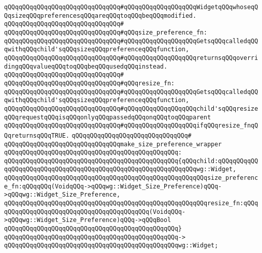 \verb|qQQqqQQqqQQqqQQqqQQqqQQqqQQqqQQq#qQQqqQQqqQQqqQQqqQQqWidgetqQQqwhoseqQQqsizeqQQqpreferencesqQQqareqQQqtoqQQqbeqQQqmodified.|\newline
\verb|qQQqqQQqqQQqqQQqqQQqqQQqqQQqqQQq#|\newline
\verb|qQQqqQQqqQQqqQQqqQQqqQQqqQQqqQQq#qQQqsize_preference_fn:|\newline
\verb|qQQqqQQqqQQqqQQqqQQqqQQqqQQqqQQq#qQQqqQQqqQQqqQQqqQQqGetsqQQqcalledqQQqwithqQQqchild'sqQQqsizeqQQqpreferenceqQQqfunction,|\newline
\verb|qQQqqQQqqQQqqQQqqQQqqQQqqQQqqQQq#qQQqqQQqqQQqqQQqqQQqreturnsqQQqoverridingqQQqvalueqQQqtoqQQqbeqQQqusedqQQqinstead.|\newline
\verb|qQQqqQQqqQQqqQQqqQQqqQQqqQQqqQQq#|\newline
\verb|qQQqqQQqqQQqqQQqqQQqqQQqqQQqqQQq#qQQqresize_fn:|\newline
\verb|qQQqqQQqqQQqqQQqqQQqqQQqqQQqqQQq#qQQqqQQqqQQqqQQqqQQqGetsqQQqcalledqQQqwithqQQqchild'sqQQqsizeqQQqpreferenceqQQqfunction,|\newline
\verb|qQQqqQQqqQQqqQQqqQQqqQQqqQQqqQQq#qQQqqQQqqQQqqQQqqQQqchild'sqQQqresizeqQQqrequestqQQqisqQQqonlyqQQqpassedqQQqonqQQqtoqQQqparent|\newline
\verb|qQQqqQQqqQQqqQQqqQQqqQQqqQQqqQQq#qQQqqQQqqQQqqQQqqQQqifqQQqresize_fnqQQqreturnsqQQqTRUE.|\newline
\verb|qQQqqQQqqQQqqQQqqQQqqQQqqQQqqQQq#|\newline
\verb|qQQqqQQqqQQqqQQqqQQqqQQqqQQqqQQqmake_size_preference_wrapper|\newline
\verb|qQQqqQQqqQQqqQQqqQQqqQQqqQQqqQQqqQQqqQQqqQQqqQQq:|\newline
\verb|qQQqqQQqqQQqqQQqqQQqqQQqqQQqqQQqqQQqqQQqqQQqqQQq{qQQqchild:qQQqqQQqqQQqqQQqqQQqqQQqqQQqqQQqqQQqqQQqqQQqqQQqqQQqqQQqqQQqqQQqwg::Widget,|\newline
\verb|qQQqqQQqqQQqqQQqqQQqqQQqqQQqqQQqqQQqqQQqqQQqqQQqqQQqqQQqsize_preference_fn:qQQqqQQq(VoidqQQq->qQQqwg::Widget_Size_Preference)qQQq->qQQqwg::Widget_Size_Preference,|\newline
\verb|qQQqqQQqqQQqqQQqqQQqqQQqqQQqqQQqqQQqqQQqqQQqqQQqqQQqqQQqresize_fn:qQQqqQQqqQQqqQQqqQQqqQQqqQQqqQQqqQQqqQQqqQQq(VoidqQQq->qQQqwg::Widget_Size_Preference)qQQq->qQQqBool|\newline
\verb|qQQqqQQqqQQqqQQqqQQqqQQqqQQqqQQqqQQqqQQqqQQqqQQq}|\newline
\verb|qQQqqQQqqQQqqQQqqQQqqQQqqQQqqQQqqQQqqQQqqQQqqQQq->|\newline
\verb|qQQqqQQqqQQqqQQqqQQqqQQqqQQqqQQqqQQqqQQqqQQqqQQqwg::Widget;|\newline
